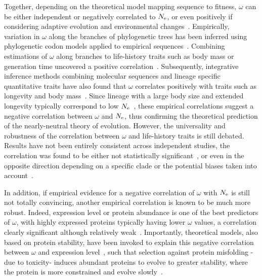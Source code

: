 Together, depending on the theoretical model mapping sequence to fitness, $\omega$ can be either independent or negatively correlated to $N_{\mathrm{e}}$, or even positively if considering adaptive evolution and environmental changes~\citep{Lanfear2014}.
Empirically, variation in $\omega$ along the branches of phylogenetic trees has been inferred using phylogenetic codon models applied to empirical sequences~\citep{Yang1998,Zhang2004}.
Combining estimations of $\omega$ along branches to life-history traits such as body mass or generation time uncovered a positive correlation~\citep{Popadin2007, Nikolaev2007}.
Subsequently, integrative inference methods combining molecular sequences and lineage specific quantitative traits have also found that $\omega$ correlates positively with traits such as longevity and body mass~\citep{Lartillot2011, Figuet2017}.
Since lineage with a large body size and extended longevity typically correspond to low $N_{\mathrm{e}}$~\citep{Romiguier2014}, these empirical correlations suggest a negative correlation between $\omega$ and $N_{\mathrm{e}}$, thus confirming the theoretical prediction of the nearly-neutral theory of evolution.
However, the universality and robustness of the correlation between $\omega$ and life-history traits is still debated.
Results have not been entirely consistent across independent studies, the correlation was found to be either not statistically significant~\citep{Lartillot2012}, or even in the opposite direction depending on a specific clade or the potential biases taken into account~\citep{Lanfear2010, Nabholz2013, Lanfear2014, Figuet2016}.

In addition, if empirical evidence for a negative correlation of $\omega$ with $N_{\mathrm{e}}$ is still not totally convincing, another empirical correlation is known to be much more robust.
Indeed, expression level or protein abundance is one of the best predictors of $\omega$, with highly expressed proteins typically having lower $\omega$ values, a correlation clearly significant although relatively weak~\citep{Duret2000, Rocha2004, Drummond2005a, Zhang2015, Song2017}.
Importantly, theoretical models, also based on protein stability, have been invoked to explain this negative correlation between $\omega$ and expression level~\citep{Wilke2006, Drummond2008}, such that selection against protein misfolding -due to toxicity- induces abundant proteins to evolve to greater stability, where the protein is more constrained and evolve slowly~\citep{Serohijos2012}.

